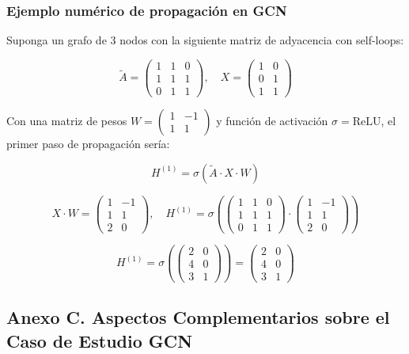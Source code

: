 \documentclass[11pt]{article} %
\begin{document}
\subsubsection{Ejemplo numérico de propagación en GCN}
Suponga un grafo de 3 nodos con la siguiente matriz de adyacencia con self-loops:

\[
\tilde{A} = 
\begin{pmatrix}
1 & 1 & 0 \\
1 & 1 & 1 \\
0 & 1 & 1
\end{pmatrix}, \quad
X = 
\begin{pmatrix}
1 & 0 \\
0 & 1 \\
1 & 1
\end{pmatrix}
\]

Con una matriz de pesos $W = 
\begin{pmatrix}
1 & -1 \\
1 & 1
\end{pmatrix}$ y función de activación $\sigma = \text{ReLU}$, el primer paso de propagación sería:

\[
H^{(1)} = \sigma \left( \tilde{A} \cdot X \cdot W \right)
\]

\[
X \cdot W = 
\begin{pmatrix}
1 & -1 \\
1 & 1 \\
2 & 0
\end{pmatrix}, \quad
H^{(1)} = \sigma \left(
\begin{pmatrix}
1 & 1 & 0 \\
1 & 1 & 1 \\
0 & 1 & 1
\end{pmatrix}
\cdot 
\begin{pmatrix}
1 & -1 \\
1 & 1 \\
2 & 0
\end{pmatrix}
\right)
\]

\[
H^{(1)} = \sigma \left(
\begin{pmatrix}
2 & 0 \\
4 & 0 \\
3 & 1
\end{pmatrix}
\right)
=
\begin{pmatrix}
2 & 0 \\
4 & 0 \\
3 & 1
\end{pmatrix}
\]

\subsection{Anexo C. Aspectos Complementarios sobre el Caso de Estudio GCN}
\end{document}
